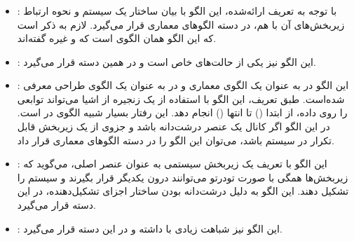 \subsubsection{}
\begin{itemize}
\item {}: %
با توجه به تعریف ارائه‌شده، این الگو با بیان ساختار یک سیستم و نحوه
ارتباط زیربخش‌های آن با هم، در دسته الگوهای معماری قرار می‌گیرد.
لازم به ذکر است که این الگو همان الگوی  است
که  و غیره \cite{ref6} گفته‌اند.
\item {}: %
این الگو نیز یکی از حالت‌های خاص 
است و در همین دسته قرار می‌گیرد.
\item {}: %
این الگو در \cite{ref4} به عنوان یک الگوی معماری و
در \cite{ref1} به عنوان یک الگوی طراحی معرفی شده‌است.
طبق تعریف، این الگو با استفاده از یک زنجیره از اشیا می‌تواند توابعی را روی
داده، از ابتدا () تا انتها () انجام دهد.
این رفتار بسیار شبیه الگوی  در \cite{ref6}
است. در این الگو اگر کانال یک عنصر درشت‌دانه باشد و جزوی از یک زیربخش
قابل تکرار در سیستم باشد، می‌توان این الگو را در دسته الگوهای معماری قرار داد.
\item {}: %
این الگو با تعریف یک زیربخش سیستمی به عنوان عنصر اصلی، مي‌گوید که
زیربخش‌ها همگی با صورت تودرتو می‌توانند درون یکدیگر قرار بگیرند و سیستم را
تشکیل دهند. این الگو به دلیل درشت‌دانه بودن ساختار اجزای تشکیل‌دهنده،
در این دسته قرار می‌گیرد.
\item {}: %
این الگو نیز شباهت زیادی با  داشته
و در این دسته قرار می‌گیرد.
\end{itemize}

